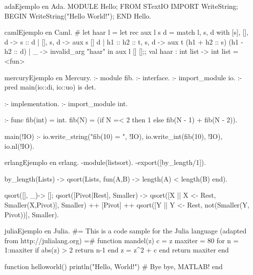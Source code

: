\begin{sourcecode}{ada}{Ejemplo en Ada.}
MODULE Hello;
FROM STextIO IMPORT WriteString;
BEGIN
  WriteString("Hello World!");
END Hello.
\end{sourcecode}

\begin{sourcecode}{caml}{Ejemplo en Caml.}
# let haar l =
   let rec aux l s d = 
     match l, s, d with
       [s], [], d -> s :: d
     | [], s, d -> aux s [] d
     | h1 :: h2 :: t, s, d -> aux t (h1 + h2 :: s) (h1 - h2 :: d)
     | _ -> invalid_arg "haar" 
     in aux l [] [];;
val haar : int list -> int list = <fun>
\end{sourcecode}

\begin{sourcecode}{mercury}{Ejemplo en Mercury.}
 :- module fib.
 :- interface.
 :- import_module io.
 :- pred main(io::di, io::uo) is det.
 
 :- implementation.
 :- import_module int.

 :- func fib(int) = int.
 fib(N) = (if N =< 2 then 1 else fib(N - 1) + fib(N - 2)).

 main(!IO) :-
        io.write_string("fib(10) = ", !IO),
        io.write_int(fib(10), !IO),
        io.nl(!IO).
\end{sourcecode}

\begin{sourcecode}{erlang}{Ejemplo en erlang.}
-module(listsort).
-export([by_length/1]).

by_length(Lists) -> %
   qsort(Lists, fun(A,B) -> length(A) < length(B) end).

qsort([], _)-> []; %
qsort([Pivot|Rest], Smaller) ->
    qsort([X || X <- Rest, Smaller(X,Pivot)], Smaller)
    ++ [Pivot] ++
    qsort([Y || Y <- Rest, not(Smaller(Y, Pivot))], Smaller).
\end{sourcecode}

\begin{sourcecode}{julia}{Ejemplo en Julia.}
#= This is a code sample for the Julia language
(adapted from http://julialang.org) =#
function mandel(z)
    c = z
    maxiter = 80
    for n = 1:maxiter
        if abs(z) > 2
            return n-1
        end
        z = z^2 + c
    end
    return maxiter
end

function helloworld()
    println("Hello, World!") # Bye bye, MATLAB!
end
\end{sourcecode}

